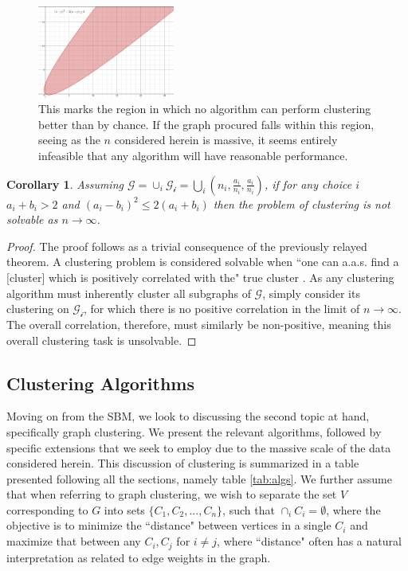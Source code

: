 \documentclass[journal]{IEEEtran}
\newtheorem{corollary}{Corollary}[theorem]
\begin{document}
\begin{figure}
    \label{fig:region}
    \centering
    \includegraphics[width=0.4\textwidth]{region.png}
    \caption{This marks the region in which no algorithm can perform clustering better than by chance. If the graph procured falls within this region, seeing as the $n$ considered herein is massive, it seems entirely infeasible that any algorithm will have reasonable performance.}
\end{figure}

\begin{corollary}
Assuming $\mathcal{G}=\cup_{i}\mathcal{G_i}=\bigcup_{i}(n_i,\frac{a_i}{n_i},\frac{a_i}{n_i})$, if for any choice $i$ $a_i + b_i > 2$ and $(a_i-b_i)^2\le2(a_i+b_i)$ then the problem of clustering is not solvable as $n\rightarrow\infty$.
\end{corollary}

\begin{proof}
The proof follows as a trivial consequence of the previously relayed theorem. A clustering problem is considered solvable when ``one can a.a.s. find a [cluster] which is positively correlated with the" true cluster \cite{sbm}. As any clustering algorithm must inherently cluster all subgraphs of $\mathcal{G}$, simply consider its clustering on $\mathcal{G_i}$, for which there is no positive correlation in the limit of $n\rightarrow\infty$. The overall correlation, therefore, must similarly be non-positive, meaning this overall clustering task is unsolvable.
\end{proof}

\subsection{Clustering Algorithms}
Moving on from the SBM, we look to discussing the second topic at hand, specifically graph clustering. We present the relevant algorithms, followed by specific extensions that we seek to employ due to the massive scale of the data considered herein. This discussion of clustering is summarized in a table presented following all the sections, namely table \ref{tab:algs}. We further assume that when referring to graph clustering, we wish to separate the set $V$ corresponding to $G$ into sets $\{C_1, C_2, ..., C_n\}$, such that $\cap_{i} C_{i} = \emptyset$, where the objective is to minimize the ``distance" between vertices in a single $C_i$ and maximize that between any $C_i,C_j$ for $i\neq j$, where ``distance" often has a natural interpretation as related to edge weights in the graph. 
\end{document}
